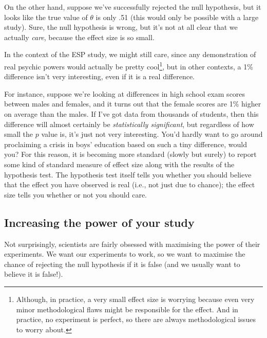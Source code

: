 \documentclass[
]{book}
\theoremstyle{definition}
\theoremstyle{definition}
\theoremstyle{definition}
\theoremstyle{definition}
\theoremstyle{remark}
\begin{document}
On the other hand, suppose we've successfully rejected the null hypothesis, but it looks like the true value of \(\theta\) is only .51 (this would only be possible with a large study). Sure, the null hypothesis is wrong, but it's not at all clear that we actually \emph{care}, because the effect size is so small.

In the context of the ESP study, we might still care, since any demonstration of real psychic powers would actually be pretty cool\footnote{Although, in practice, a very small effect size is worrying because even very minor methodological flaws might be responsible for the effect. And in practice, no experiment is perfect, so there are always methodological issues to worry about.}, but in other contexts, a 1\% difference isn't very interesting, even if it is a real difference.

For instance, suppose we're looking at differences in high school exam scores between males and females, and it turns out that the female scores are 1\% higher on average than the males. If I've got data from thousands of students, then this difference will almost certainly be \emph{statistically significant}, but regardless of how small the \(p\) value is, it's just not very interesting. You'd hardly want to go around proclaiming a crisis in boys' education based on such a tiny difference, would you? For this reason, it is becoming more standard (slowly but surely) to report some kind of standard measure of effect size along with the results of the hypothesis test. The hypothesis test itself tells you whether you should believe that the effect you have observed is real (i.e., not just due to chance); the effect size tells you whether or not you should care.

\hypertarget{increasing-the-power-of-your-study}{%
\subsection{Increasing the power of your study}\label{increasing-the-power-of-your-study}}

Not surprisingly, scientists are fairly obsessed with maximising the power of their experiments. We want our experiments to work, so we want to maximise the chance of rejecting the null hypothesis if it is false (and we usually want to believe it is false!).
\end{document}
